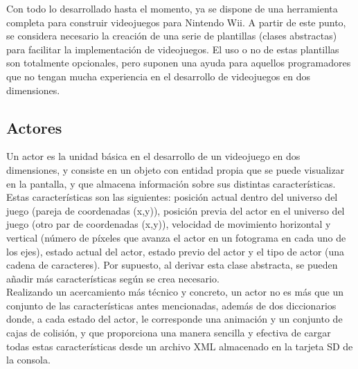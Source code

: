 



Con todo lo desarrollado hasta el momento, ya se dispone de una herramienta completa para construir videojuegos para Nintendo Wii. A partir de este punto, se considera necesario la creación de una serie de plantillas (clases abstractas) para facilitar la implementación de videojuegos. El uso o no de estas plantillas son totalmente opcionales, pero suponen una ayuda para aquellos programadores que no tengan mucha experiencia en el desarrollo de videojuegos en dos dimensiones.

\subsection{Actores}

Un actor es la unidad básica en el desarrollo de un videojuego en dos dimensiones, y consiste en un objeto con entidad propia que se puede visualizar en la pantalla, y que almacena información sobre sus distintas características. Estas características son las siguientes: posición actual dentro del universo del juego (pareja de coordenadas (x,y)), posición previa del actor en el universo del juego (otro par de coordenadas (x,y)), velocidad de movimiento horizontal y vertical (número de píxeles que avanza el actor en un fotograma en cada uno de los ejes), estado actual del actor, estado previo del actor y el tipo de actor (una cadena de caracteres). Por supuesto, al derivar esta clase abstracta, se pueden añadir más características según se crea necesario.\\

Realizando un acercamiento más técnico y concreto, un actor no es más que un conjunto de las características antes mencionadas, además de dos diccionarios donde, a cada estado del actor, le corresponde una animación y un conjunto de cajas de colisión, y que proporciona una manera sencilla y efectiva de cargar todas estas características desde un archivo XML almacenado en la tarjeta SD de la consola.\\

